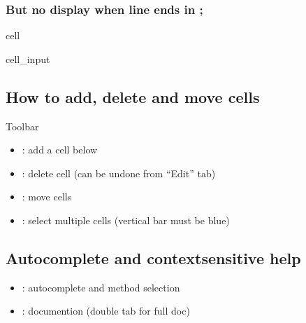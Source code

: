 \documentclass[letterpaper,10pt,english]{jupyterBook}
\begin{document}
\subsubsection{But no display when line ends in ;}
\label{\detokenize{content/Python/Intro_Jupyter_notebook:but-no-display-when-line-ends-in}}
\begin{sphinxuseclass}{cell}\begin{sphinxVerbatimInput}

\begin{sphinxuseclass}{cell_input}
\begin{sphinxVerbatim}[commandchars=\\\{\}]
  
\end{sphinxVerbatim}

\end{sphinxuseclass}\end{sphinxVerbatimInput}

\end{sphinxuseclass}

\subsection{How to add, delete and move cells}
\label{\detokenize{content/Python/Intro_Jupyter_notebook:how-to-add-delete-and-move-cells}}
\sphinxAtStartPar
Toolbar
\begin{itemize}
\item {} 
\sphinxAtStartPar
{}: add a cell below

\item {} 
\sphinxAtStartPar
{}: delete cell (can be undone from “Edit” tab)

\item {} 
\sphinxAtStartPar
{}: move cells

\item {} 
\sphinxAtStartPar
{}: select multiple cells (vertical bar must be blue)

\end{itemize}


\subsection{Auto\sphinxhyphen{}complete and context\sphinxhyphen{}sensitive help}
\label{\detokenize{content/Python/Intro_Jupyter_notebook:auto-complete-and-context-sensitive-help}}\begin{itemize}
\item {} 
\sphinxAtStartPar
{}: autocomplete and  method selection

\item {} 
\sphinxAtStartPar
{}: documention (double tab for full doc)

\end{itemize}
\end{document}
